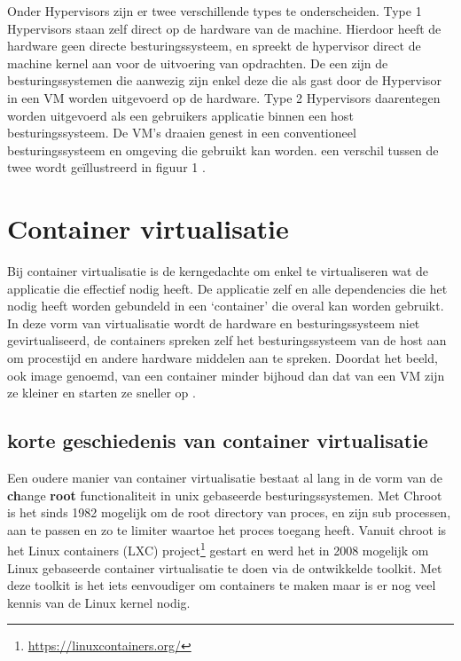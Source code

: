 Onder Hypervisors zijn er twee verschillende  types te onderscheiden. Type 1 Hypervisors staan zelf direct op de hardware van de machine. Hierdoor heeft de hardware geen directe besturingssysteem, en spreekt de hypervisor direct de machine kernel aan voor de uitvoering van opdrachten. De  een zijn de besturingssystemen die aanwezig zijn enkel deze die als gast door de Hypervisor in een VM worden uitgevoerd op de hardware. Type 2 Hypervisors daarentegen worden uitgevoerd als een gebruikers applicatie binnen een host besturingssysteem.  De VM’s draaien genest in een conventioneel besturingssysteem en omgeving die gebruikt kan worden. een verschil tussen de twee wordt geïllustreerd in figuur 1 \autocite{Yadav2018,Eder2016}.



\section{Container virtualisatie}

Bij container virtualisatie is de kerngedachte om enkel te virtualiseren wat de applicatie die effectief nodig heeft. De applicatie zelf en alle dependencies die het nodig heeft worden gebundeld in een ‘container’ die overal kan worden gebruikt. In deze vorm van virtualisatie wordt de hardware en besturingssysteem niet gevirtualiseerd, de containers spreken zelf het besturingssysteem van de host aan om procestijd en andere hardware middelen aan te spreken. Doordat het beeld, ook image genoemd, van een container minder bijhoud dan dat van een VM zijn ze kleiner en starten ze sneller op \autocite{Eder2016,jangla2018}.

\subsection{korte geschiedenis van container virtualisatie}

Een oudere manier van container virtualisatie bestaat al lang in de vorm van de \textbf{ch}ange \textbf{root} functionaliteit in unix gebaseerde besturingssystemen. Met Chroot is het sinds 1982 mogelijk om de root directory van proces, en zijn sub processen, aan te passen en zo te limiter waartoe het proces toegang heeft. Vanuit chroot is het Linux containers (LXC) project\footnote{\url{https://linuxcontainers.org/}} gestart en werd het in 2008 mogelijk om Linux gebaseerde container virtualisatie te doen via de ontwikkelde toolkit. Met deze toolkit is het iets eenvoudiger om containers te maken maar is er nog veel kennis van de Linux kernel nodig\autocite{Eder2016,SenthilKumaran2017}.

